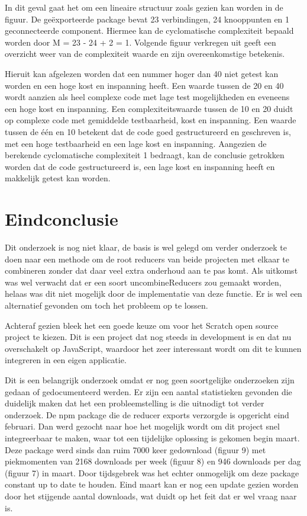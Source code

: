 In dit geval gaat het om een lineaire structuur zoals gezien kan worden in de figuur. De geëxporteerde package bevat 23 verbindingen, 24 knooppunten en 1 geconnecteerde component. Hiermee kan de cyclomatische complexiteit bepaald worden door M = 23 - 24 + 2 = 1. Volgende figuur verkregen uit \textcite{complexitynumbers} geeft een overzicht weer van de complexiteit waarde en zijn overeenkomstige betekenis. 

Hieruit kan afgelezen worden dat een nummer hoger dan 40 niet getest kan worden en een hoge kost en inspanning heeft. Een waarde tussen de 20 en 40 wordt aanzien als heel complexe code met lage test mogelijkheden en eveneens een hoge kost en inspanning. Een complexiteitswaarde tussen de 10 en 20 duidt op complexe code met gemiddelde testbaarheid, kost en inspanning. Een waarde tussen de één en 10 betekent dat de code goed gestructureerd en geschreven is, met een hoge testbaarheid en een lage kost en inspanning. Aangezien de berekende cyclomatische complexiteit 1 bedraagt, kan de conclusie getrokken worden dat de code gestructureerd is, een lage kost en inspanning heeft en makkelijk getest kan worden.






\section{Eindconclusie}
Dit onderzoek is nog niet klaar, de basis is wel gelegd om verder onderzoek te doen naar een methode om de root reducers van beide projecten met elkaar te combineren zonder dat daar veel extra onderhoud aan te pas komt. Als uitkomst was wel verwacht dat er een soort uncombineReducers zou gemaakt worden, helaas was dit niet mogelijk door de implementatie van deze functie. Er is wel een alternatief gevonden om toch het probleem op te lossen. 

Achteraf gezien bleek het een goede keuze om voor het Scratch open source project te kiezen. Dit is een project dat nog steeds in development is en dat nu overschakelt op JavaScript, waardoor het zeer interessant wordt om dit te kunnen integreren in een eigen applicatie.   

Dit is een belangrijk onderzoek omdat er nog geen soortgelijke onderzoeken zijn gedaan of gedocumenteerd werden.
Er zijn een aantal statistieken gevonden die duidelijk maken dat het een probleemstelling is die uitnodigt tot verder onderzoek. De npm package die de reducer exports verzorgde is opgericht eind februari. Dan werd gezocht naar hoe het mogelijk wordt om dit project snel integreerbaar te maken, waar tot een tijdelijke oplossing is gekomen begin maart. Deze package werd sinds dan ruim 7000 keer gedownload (figuur 9) met piekmomenten van 2168 downloads per week (figuur 8) en 946 downloads per dag (figuur 7) in maart. Door tijdsgebrek was het echter onmogelijk om deze package constant up to date te houden. Eind maart kan er nog een update gezien worden door het stijgende aantal downloads, wat duidt op het feit dat er wel vraag naar is.